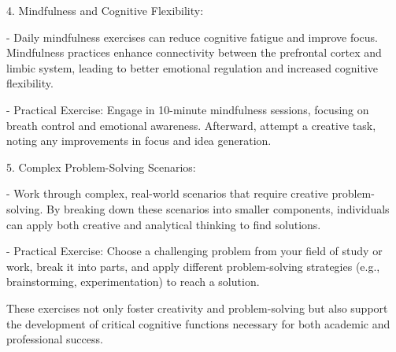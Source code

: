 \documentclass[
]{article}
\begin{document}
4. Mindfulness and Cognitive Flexibility:

- Daily mindfulness exercises can reduce cognitive fatigue and improve
focus. Mindfulness practices enhance connectivity between the prefrontal
cortex and limbic system, leading to better emotional regulation and
increased cognitive flexibility.

- Practical Exercise: Engage in 10-minute mindfulness sessions, focusing
on breath control and emotional awareness. Afterward, attempt a creative
task, noting any improvements in focus and idea generation.

5. Complex Problem-Solving Scenarios:

- Work through complex, real-world scenarios that require creative
problem-solving. By breaking down these scenarios into smaller
components, individuals can apply both creative and analytical thinking
to find solutions.

- Practical Exercise: Choose a challenging problem from your field of
study or work, break it into parts, and apply different problem-solving
strategies (e.g., brainstorming, experimentation) to reach a solution.

These exercises not only foster creativity and problem-solving but also
support the development of critical cognitive functions necessary for
both academic and professional success.
\end{document}
